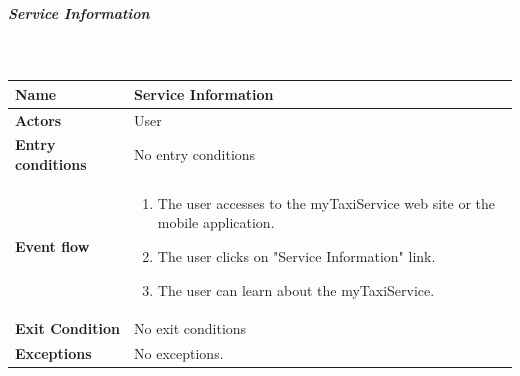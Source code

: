 \newpage
\subparagraph{Service Information}
~\\[0.2cm]
\vspace{20pt}
\noindent
\begin{tabular}{l l}
 \textbf {Name} & Service Information  \\ \hline
 \textbf{Actors} & User \\ \hline
 \textbf{Entry conditions} & No entry conditions \\ \hline
 \textbf{Event flow} & 
 \parbox{0.7\textwidth}{
 \begin{enumerate}
 \item The user accesses to the myTaxiService web site or the mobile application.
 \item The user clicks on "Service Information" link.
 \item The user can learn about the myTaxiService.
 \end{enumerate}
 } \\ \hline
 \textbf{Exit Condition} & No exit conditions \\ \hline
 \textbf{Exceptions} & No exceptions.
\end{tabular}

